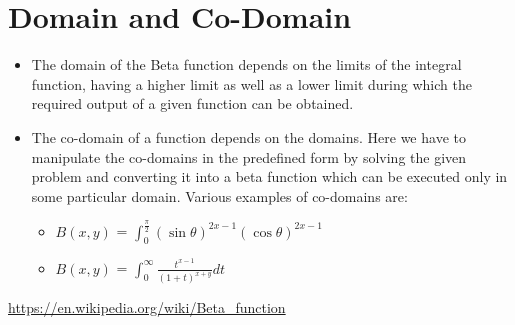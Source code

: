 \documentclass{article}
\begin{document}
\section{Domain and Co-Domain}
\begin{itemize}[noitemsep]
   \item The domain of the Beta function depends on the limits of the integral function, having a higher limit as well as a lower limit during which the required output of a given function can be obtained.
   \item The co-domain of a function depends on the domains. Here we have to manipulate the co-domains in the predefined form by solving the given problem and converting it into a beta function which can be executed only in some particular domain. Various examples of co-domains are:
    \begin{itemize}
        \item $B(x,y)$ = $\int_{0}^{\frac{\pi}{2}} (\sin \theta)^{2x-1} (\cos \theta)^{2x-1}$
        \item $B(x,y)$ = $\int_{0}^{\infty} \frac{t^{x-1}}{(1+t)^{x+y}} dt$
    \end{itemize}
    \end{itemize}
\begin{thebibliography}{9}
\url{https://en.wikipedia.org/wiki/Beta\_function}
\end{thebibliography}
    
    
\end{document}
